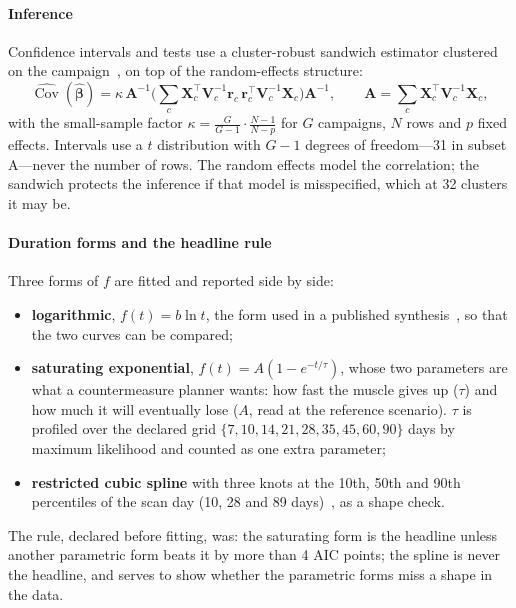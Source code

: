 \paragraph{Inference} Confidence intervals and tests use a cluster-robust sandwich estimator clustered on the
campaign~\citep{liang1986,cameron2015}, on top of the random-effects structure:
\begin{equation}
  \widehat{\operatorname{Cov}}(\hat{\bm\beta}) = \kappa\, \mathbf{A}^{-1}
  \Big( \textstyle\sum_{c} \mathbf{X}_c^{\top}\mathbf{V}_c^{-1}\mathbf{r}_c\,\mathbf{r}_c^{\top}\mathbf{V}_c^{-1}\mathbf{X}_c \Big)
  \mathbf{A}^{-1},
  \qquad
  \mathbf{A} = \textstyle\sum_{c}\mathbf{X}_c^{\top}\mathbf{V}_c^{-1}\mathbf{X}_c ,
\end{equation}
with the small-sample factor $\kappa = \tfrac{G}{G-1}\cdot\tfrac{N-1}{N-p}$ for $G$ campaigns, $N$ rows and $p$
fixed effects. Intervals use a $t$ distribution with $G-1$ degrees of freedom---31 in subset A---never the number
of rows. The random effects model the correlation; the sandwich protects the inference if that model is
misspecified, which at 32 clusters it may be.

\paragraph{Duration forms and the headline rule}
\label{sec:duration-forms}
Three forms of $f$ are fitted and reported side by side:
\begin{itemize}
  \item \textbf{logarithmic}, $f(t) = b\ln t$, the form used in a published synthesis~\citep{marusic2021}, so that the
        two curves can be compared;
  \item \textbf{saturating exponential}, $f(t) = A(1 - e^{-t/\tau})$, whose two parameters are what a
        countermeasure planner wants: how fast the muscle gives up ($\tau$) and how much it will eventually lose
        ($A$, read at the reference scenario). $\tau$ is profiled over the declared grid
        $\{7, 10, 14, 21, 28, 35, 45, 60, 90\}$ days by maximum likelihood and counted as one extra parameter;
  \item \textbf{restricted cubic spline} with three knots at the 10th, 50th and 90th percentiles of the scan day
        (10, 28 and 89 days)~\citep{harrell2015,crippa2019}, as a shape check.
\end{itemize}
The rule, declared before fitting, was: the saturating form is the headline unless another parametric form beats it
by more than 4 AIC points; the spline is never the headline, and serves to show whether the parametric forms miss a
shape in the data.

